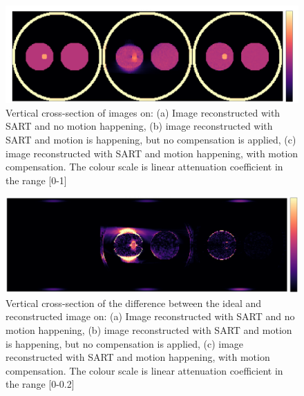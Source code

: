  \begin{figure}[h]
\begin{center}
\includegraphics[width=1\linewidth]{MotionCorrection/motion.png} 

\end{center}
\caption[Recosntruction with and without motion compensation for simple phantom]{\label{fig:result11} Vertical cross-section of images on: (a) Image reconstructed with SART and no motion happening, (b) image reconstructed with SART and motion is happening, but no compensation is applied, (c) image reconstructed with SART and motion happening, with motion compensation. The colour scale is linear attenuation coefficient in the range [0-1]} 
\end{figure}
 
 
 
 \begin{figure}[H]
\begin{center}
\includegraphics[width=1\linewidth]{MotionCorrection/steven2.png} 

\end{center}
\caption[Error with and without motion compensation for simple phantom]{\label{fig:result12} Vertical cross-section of the difference between the ideal and reconstructed image on: (a) Image reconstructed with SART and no motion happening, (b) image reconstructed with SART and motion is happening, but no compensation is applied, (c) image reconstructed with SART and motion happening, with motion compensation. The colour scale is linear attenuation coefficient in the range [0-0.2]} 
\end{figure}


